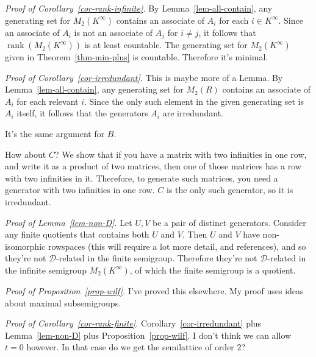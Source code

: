 \documentclass{article}
\newcommand{\rank}{\operatorname{rank}}
\newcommand{\D}{\mathscr{D}}
\theoremstyle{definition}
\begin{document}
\quad\newline
\textit{Proof of Corollary~\ref{cor-rank-infinite}.}
By Lemma~\ref{lem-all-contain}, any generating set for $M_{2}(K^{\infty})$
contains an associate of $A_{i}$ for each $i \in K^{\infty}$. Since an associate
of $A_{i}$ is not an associate of $A_{j}$ for $i \neq j$, it follows that
$\rank(M_{2}(K^{\infty}))$ is at least countable. The generating set for
$M_{2}(K^{\infty})$ given in Theorem~\ref{thm-min-plus} is countable. Therefore
it's minimal.

\quad\newline
\textit{Proof of Corollary~\ref{cor-irredundant}.}
This is maybe more of a Lemma. By Lemma~\ref{lem-all-contain}, any generating
set for $M_{2}(R)$ contains an associate of $A_{i}$ for each relevant $i$.
Since the only such element in the given generating set is $A_{i}$ itself, it
follows that the generators $A_{i}$ are irredundant.

It's the same argument for $B$.

How about $C$? We show that if you have a matrix with two
infinities in one row, and write it as a product of two matrices, then
one of those matrices has a row with two infinities in it. Therefore, to
generate such matrices, you need a generator with two infinities in one row. $C$
is the only such generator, so it is irredundant.

\quad\newline
\textit{Proof of Lemma~\ref{lem-non-D}.}
Let $U, V$ be a pair of distinct generators. Consider any finite
quotients that contains both $U$ and $V$. Then $U$ and $V$ have non-isomorphic
rowspaces (this will require a lot more detail, and references), and so they're
not $\D$-related in the finite semigroup. Therefore they're not $\D$-related in
the infinite semigroup $M_{2}(K^{\infty})$, of which the finite semigroup is a
quotient.

\quad\newline
\textit{Proof of Proposition~\ref{prop-wilf}.}
I've proved this elsewhere. My proof uses ideas about maximal subsemigroups.

\quad\newline
\textit{Proof of Corollary~\ref{cor-rank-finite}.}
Corollary~\ref{cor-irredundant} plus Lemma~\ref{lem-non-D} plus
Proposition~\ref{prop-wilf}. I don't think we can allow $t = 0$ however.
In that case do we get the semilattice of order $2$?
\end{document}
